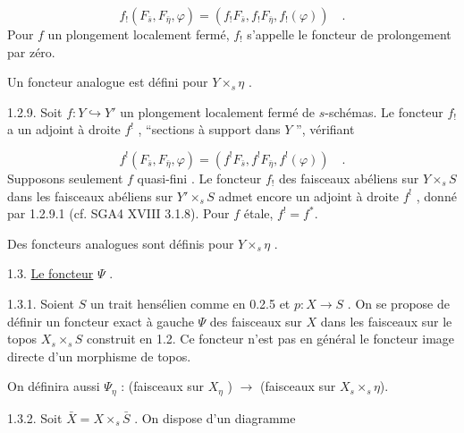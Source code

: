 \begin{equation}\tag{1.2.8.1}
f_{!} (F_{\bar{s}}, F_{\bar{\eta}} , \varphi) = (f_{!} F_{\bar{s}} , f_{!} F_{\bar{\eta}} , f_{!}(\varphi)) \quad .
\end{equation}
Pour $f$ un plongement localement fermé, $f_{!}$ s'appelle le foncteur de prolongement par zéro.

Un foncteur analogue est défini pour $Y \times_s \eta$ .

1.2.9. Soit $f : Y \hookrightarrow Y'$ un plongement localement fermé de $s$-schémas. Le foncteur $f_{!}$ a un adjoint à droite $f^{!}$ , ``sections à support dans $Y$ '', vérifiant

\begin{equation}\tag{1.2.9.1}
f^{!} (F_{\bar{s}}, F_{\bar{\eta}} , \varphi) = (f^{!} F_{\bar{s}}, f^{!} F_{\bar{\eta}} , f^{!} (\varphi)) \quad .
\end{equation}
Supposons seulement $f$ quasi-fini . Le foncteur $f_{!}$ des faisceaux abéliens sur $Y \times_s S$ dans les faisceaux abéliens sur $Y' \times_s S$ admet encore un adjoint à droite $f^{!}$ , donné par 1.2.9.1 (cf. SGA4 XVIII 3.1.8). Pour $f$ étale, $f^{!} = f^{*}$.

Des foncteurs analogues sont définis pour $Y \times_s \eta$ .




1.3. \underline{Le foncteur} $\Psi$ .

1.3.1. Soient $S$ un trait hensélien comme en 0.2.5 et $p : X \longrightarrow S$ . On se propose de définir un foncteur exact à gauche $\Psi$ des faisceaux sur $X$ dans les faisceaux sur le topos $X_s \times_s S$ construit en 1.2. Ce foncteur n'est pas en général le foncteur image directe d'un morphisme de topos.

On définira aussi $\Psi_\eta$ : (faisceaux sur $X_\eta$ ) $\longrightarrow$ (faisceaux sur $X_s \times_s \eta$).

1.3.2. Soit $\bar X = X \times_s \bar S$ . On dispose d'un diagramme


